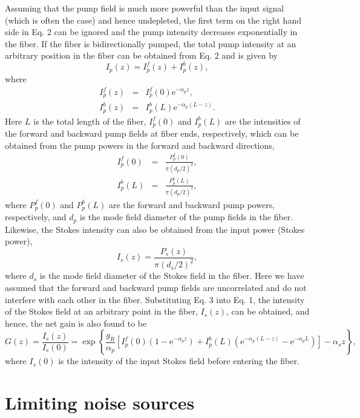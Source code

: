 Assuming that the pump field is much more powerful than the input signal (which is often the case) and hence undepleted, the first term on the right hand side in Eq. 2 can be ignored and the pump intensity decreases exponentially in the fiber. If the fiber is bidirectionally pumped, the total pump intensity at an arbitrary position in the fiber can be obtained from Eq. 2 and is given by
\begin{equation}
I_p(z) = I_p^f(z) + I_p^b(z), 
\end{equation}
where 
\begin{eqnarray}
I_p^f(z) &=& I_p^f(0) \mathrm{e}^{-\alpha_p z}, \\
I_p^b(z) &=& I_p^b(L) \mathrm{e}^{-\alpha_p (L-z)}. 
\end{eqnarray}
Here $L$ is the total length of the fiber, $I_p^f(0)$ and $I_p^b(L)$ are the intensities of the forward and backward pump fields at fiber ends, respectively, which can be obtained from the pump powers in the forward and backward directions,
\begin{eqnarray}
I_p^f(0) &=& \frac{P_p^f(0)}{\pi(d_p/2)^2}, \\
I_p^b(L) &=& \frac{P_p^b(L)}{\pi(d_p/2)^2},
\end{eqnarray}
where $P_p^f(0)$ and $P_p^b(L)$ are the forward and backward pump powers, respectively, and $d_p$ is the mode field diameter of the pump fields in the fiber. Likewise, the Stokes intensity can also be obtained from the input power (Stokes power),
\begin{equation}
I_s(z) = \frac{P_s(z)}{\pi(d_s/2)^2},
\end{equation}
where $d_s$ is the mode field diameter of the Stokes field in the fiber. Here we have assumed that the forward and backward pump fields are uncorrelated and do not interfere with each other in the fiber.
Substituting Eq. 3 into Eq. 1, the intensity of the Stokes field at an arbitrary point in the fiber, $I_s(z)$, can be obtained, and hence, the net gain is also found to be
\begin{equation}
G(z)=\frac{I_s(z)}{I_s(0)}=\exp\left\{\frac{g_R}{\alpha_p} \left[I_{p}^f(0)\left(1-\mathrm{e}^{-\alpha_p z}\right)+I_{p}^b(L)\left(\mathrm{e}^{-\alpha_p (L-z)}-\mathrm{e}^{-\alpha_p L}\right)\right]- \alpha_s z\right\}, \label{eq:Gain}
\end{equation}
where $I_s(0)$ is the intensity of the input Stokes field before entering the fiber.

\section{Limiting noise sources}

